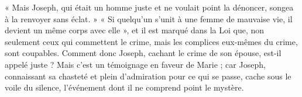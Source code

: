 « Mais Joseph, qui était un homme juste et ne voulait point la dénoncer, songea à la renvoyer sans éclat. » « Si quelqu’un s’unit à une femme de mauvaise vie, il devient un même corps avec elle », et il est marqué dans la Loi que, non seulement ceux qui commettent le crime, mais les complices eux-mêmes du crime, sont coupables. Comment donc Joseph, cachant le crime de son épouse, est-il appelé juste ? Mais c’est un témoignage en faveur de Marie ; car Joseph, connaissant sa chasteté et plein d’admiration pour ce qui se passe, cache sous le voile du silence, l’événement dont il ne comprend point le mystère.
